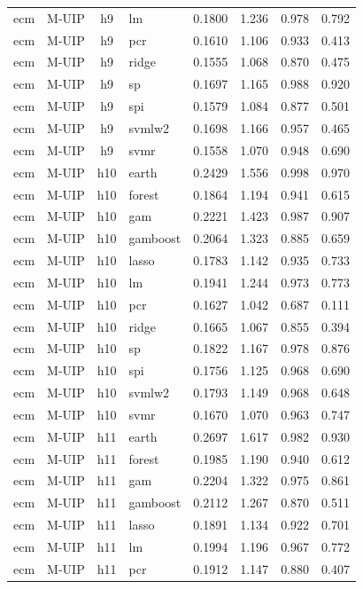 \begin{ThreePartTable}
\begin{longtable}[t]{llclcccc}
ecm & M-UIP & h9 & lm & 0.1800 & 1.236 & 0.978 & 0.792\\
ecm & M-UIP & h9 & pcr & 0.1610 & 1.106 & 0.933 & 0.413\\
ecm & M-UIP & h9 & ridge & 0.1555 & 1.068 & 0.870 & 0.475\\
ecm & M-UIP & h9 & sp & 0.1697 & 1.165 & 0.988 & 0.920\\
ecm & M-UIP & h9 & spi & 0.1579 & 1.084 & 0.877 & 0.501\\
ecm & M-UIP & h9 & svmlw2 & 0.1698 & 1.166 & 0.957 & 0.465\\
ecm & M-UIP & h9 & svmr & 0.1558 & 1.070 & 0.948 & 0.690\\
\addlinespace
ecm & M-UIP & h10 & earth & 0.2429 & 1.556 & 0.998 & 0.970\\
ecm & M-UIP & h10 & forest & 0.1864 & 1.194 & 0.941 & 0.615\\
ecm & M-UIP & h10 & gam & 0.2221 & 1.423 & 0.987 & 0.907\\
ecm & M-UIP & h10 & gamboost & 0.2064 & 1.323 & 0.885 & 0.659\\
ecm & M-UIP & h10 & lasso & 0.1783 & 1.142 & 0.935 & 0.733\\
ecm & M-UIP & h10 & lm & 0.1941 & 1.244 & 0.973 & 0.773\\
ecm & M-UIP & h10 & pcr & 0.1627 & 1.042 & 0.687 & 0.111\\
ecm & M-UIP & h10 & ridge & 0.1665 & 1.067 & 0.855 & 0.394\\
ecm & M-UIP & h10 & sp & 0.1822 & 1.167 & 0.978 & 0.876\\
ecm & M-UIP & h10 & spi & 0.1756 & 1.125 & 0.968 & 0.690\\
ecm & M-UIP & h10 & svmlw2 & 0.1793 & 1.149 & 0.968 & 0.648\\
ecm & M-UIP & h10 & svmr & 0.1670 & 1.070 & 0.963 & 0.747\\
\addlinespace
ecm & M-UIP & h11 & earth & 0.2697 & 1.617 & 0.982 & 0.930\\
ecm & M-UIP & h11 & forest & 0.1985 & 1.190 & 0.940 & 0.612\\
ecm & M-UIP & h11 & gam & 0.2204 & 1.322 & 0.975 & 0.861\\
ecm & M-UIP & h11 & gamboost & 0.2112 & 1.267 & 0.870 & 0.511\\
ecm & M-UIP & h11 & lasso & 0.1891 & 1.134 & 0.922 & 0.701\\
ecm & M-UIP & h11 & lm & 0.1994 & 1.196 & 0.967 & 0.772\\
ecm & M-UIP & h11 & pcr & 0.1912 & 1.147 & 0.880 & 0.407\\

\end{longtable}
\end{ThreePartTable}
